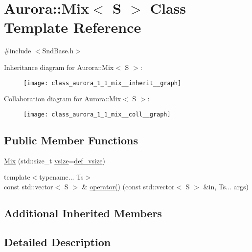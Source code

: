 \hypertarget{class_aurora_1_1_mix}{}\section{Aurora\+:\+:Mix$<$ S $>$ Class Template Reference}
\label{class_aurora_1_1_mix}


{\ttfamily \#include $<$Snd\+Base.\+h$>$}



Inheritance diagram for Aurora\+:\+:Mix$<$ S $>$\+:
\nopagebreak
\begin{figure}[H]
\begin{center}
\leavevmode
\texttt{[image: class\_aurora\_1\_1\_mix\_\_inherit\_\_graph]}
\end{center}
\end{figure}


Collaboration diagram for Aurora\+:\+:Mix$<$ S $>$\+:
\nopagebreak
\begin{figure}[H]
\begin{center}
\leavevmode
\texttt{[image: class\_aurora\_1\_1\_mix\_\_coll\_\_graph]}
\end{center}
\end{figure}
\subsection*{Public Member Functions}
\begin{DoxyCompactItemize}
\item 
\hyperlink{class_aurora_1_1_mix_aa3b9e9322e58a0b47d4ed3a12fbe2b94}{Mix} (std\+::size\+\_\+t \hyperlink{class_aurora_1_1_snd_base_af9e21aaf411b17f7a8221c991ce5d291}{vsize}=\hyperlink{namespace_aurora_afaaddf667a06e7ce23c667a8b7295263}{def\+\_\+vsize})
\item 
{\footnotesize template$<$typename... Ts$>$ }\\const std\+::vector$<$ S $>$ \& \hyperlink{class_aurora_1_1_mix_ad9ea4686dddb338fcb03519e4e385a1d}{operator()} (const std\+::vector$<$ S $>$ \&in, Ts... args)
\end{DoxyCompactItemize}
\subsection*{Additional Inherited Members}


\subsection{Detailed Description}
